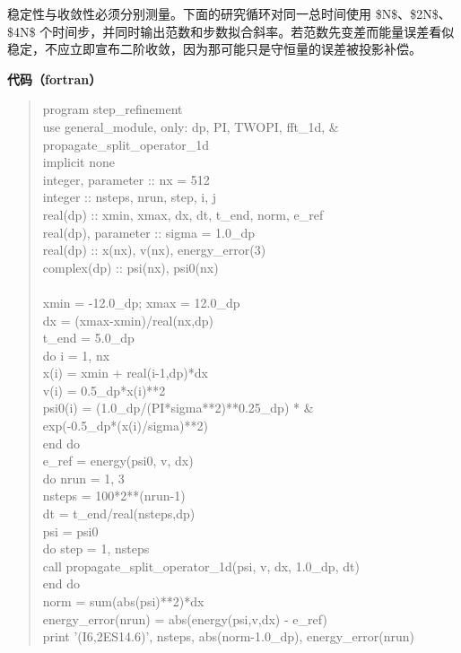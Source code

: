 \documentclass[UTF8,openany,11pt,fontset=fandol]{ctexbook}
\begin{document}
稳定性与收敛性必须分别测量。下面的研究循环对同一总时间使用
\$N\$、\$2N\$、\$4N\$
个时间步，并同时输出范数和步数拟合斜率。若范数先变差而能量误差看似稳定，不应立即宣布二阶收敛，因为那可能只是守恒量的误差被投影补偿。

\textbf{代码（fortran）}

\begin{quote}
program step\_refinement\\
use general\_module, only: dp, PI, TWOPI, fft\_1d, \&\\
propagate\_split\_operator\_1d\\
implicit none\\
integer, parameter :: nx = 512\\
integer :: nsteps, nrun, step, i, j\\
real(dp) :: xmin, xmax, dx, dt, t\_end, norm, e\_ref\\
real(dp), parameter :: sigma = 1.0\_dp\\
real(dp) :: x(nx), v(nx), energy\_error(3)\\
complex(dp) :: psi(nx), psi0(nx)\\
~\\
xmin = -12.0\_dp; xmax = 12.0\_dp\\
dx = (xmax-xmin)/real(nx,dp)\\
t\_end = 5.0\_dp\\
do i = 1, nx\\
x(i) = xmin + real(i-1,dp)*dx\\
v(i) = 0.5\_dp*x(i)**2\\
psi0(i) = (1.0\_dp/(PI*sigma**2)**0.25\_dp) * \&\\
exp(-0.5\_dp*(x(i)/sigma)**2)\\
end do\\
e\_ref = energy(psi0, v, dx)\\
do nrun = 1, 3\\
nsteps = 100*2**(nrun-1)\\
dt = t\_end/real(nsteps,dp)\\
psi = psi0\\
do step = 1, nsteps\\
call propagate\_split\_operator\_1d(psi, v, dx, 1.0\_dp, dt)\\
end do\\
norm = sum(abs(psi)**2)*dx\\
energy\_error(nrun) = abs(energy(psi,v,dx) - e\_ref)\\
print '(I6,2ES14.6)', nsteps, abs(norm-1.0\_dp), energy\_error(nrun)\\

\end{quote}
\end{document}
